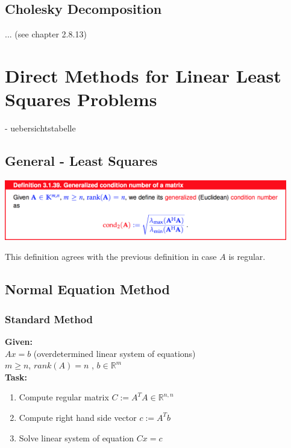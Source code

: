 \documentclass[12pt, a4paper]{article}
\newcommand{\R}{\mathbb{R}}
\begin{document}
\subsection{Cholesky Decomposition}
... (see chapter 2.8.13)

\newpage
\section{Direct Methods for Linear Least Squares Problems}

- uebersichtstabelle

\subsection{General - Least Squares}

\begin{center}
	\includegraphics[width=350pt]{cond.png}
\end{center}

This definition agrees with the previous definition in case $A$ is regular.

\subsection{Normal Equation Method}

\subsubsection{Standard Method}

\begin{tcolorbox}
\textbf{Given:}\\
$Ax = b$ (overdetermined linear system of equations) \\
$m \geq n$, $rank(A)=n$ ,  $b \in \R^{m}$\vspace{2mm}\\
\textbf{Task:} \vspace{-2mm}
\begin{enumerate}[noitemsep]
	\item Compute regular matrix $C := A^TA \in \R^{n,n}$
	\item Compute right hand side vector $c := A^Tb$
	\item Solve linear system of equation $Cx = c$
\end{enumerate}
\end{tcolorbox}
\end{document}
